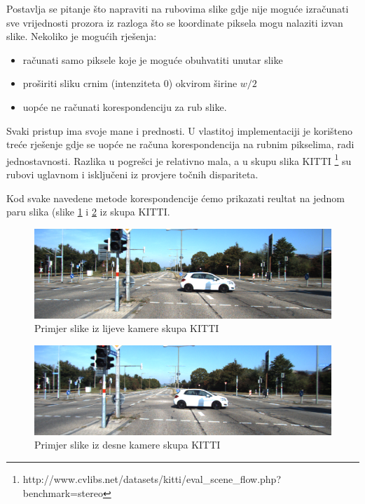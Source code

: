 \documentclass[utf8, zavrsni, numeric]{fer}
\begin{document}
Postavlja se pitanje što napraviti na rubovima slike gdje nije moguće izračunati sve vrijednosti prozora iz razloga što se koordinate piksela mogu nalaziti izvan slike. Nekoliko je mogućih rješenja:
\begin{itemize}
  \item računati samo piksele koje je moguće obuhvatiti unutar slike
  \item proširiti sliku crnim (intenziteta 0) okvirom širine $w/2$
  \item uopće ne računati korespondenciju za rub slike.
\end{itemize}

Svaki pristup ima svoje mane i prednosti. U vlastitoj implementaciji je korišteno treće rješenje gdje se uopće ne računa korespondencija na rubnim pikselima, radi jednostavnosti. Razlika u pogrešci je relativno
mala, a u skupu slika KITTI \footnote{http://www.cvlibs.net/datasets/kitti/eval\_scene\_flow.php?benchmark=stereo} su rubovi uglavnom i isključeni iz provjere točnih dispariteta.

Kod svake navedene metode korespondencije ćemo prikazati reultat na jednom paru slika (slike \ref{fig:lijeva_KITTI} i \ref{fig:desna_KITTI} iz skupa KITTI.

\begin{figure}[htb]
  \centering
  \includegraphics[width=14cm]{img/000046_10_2.png}
  \caption{Primjer slike iz lijeve kamere skupa KITTI}
  \label{fig:lijeva_KITTI}
\end{figure}

\begin{figure}[htb]
  \centering
  \includegraphics[width=14cm]{img/000046_10_3.png}
  \caption{Primjer slike iz desne kamere skupa KITTI}
  \label{fig:desna_KITTI}
\end{figure}
\end{document}
